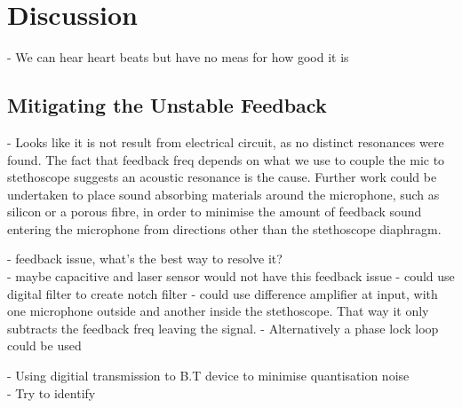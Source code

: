 \chapter{Discussion} \label{discussion}

- We can hear heart beats but have no meas for how good it is \\

\section{Mitigating the Unstable Feedback}

- Looks like it is not result from electrical circuit, as no distinct resonances were  found. The fact that feedback freq depends on what we use to couple the mic to stethoscope suggests an acoustic resonance is the cause. Further work could be undertaken to place sound absorbing materials around the microphone, such as silicon or a porous fibre, in order to minimise the amount of feedback sound entering the microphone from directions other than the stethoscope diaphragm. 

- feedback issue, what's the best way to resolve it? \\
	- maybe capacitive and laser sensor would not have this feedback issue
	- could use digital filter to create notch filter
	- could use difference amplifier at input, with one microphone outside and another inside the stethoscope. That way it only subtracts the feedback freq leaving the signal.
	- Alternatively a phase lock loop could be used

- Using digitial transmission to B.T device to minimise quantisation noise \\
- Try to identify 